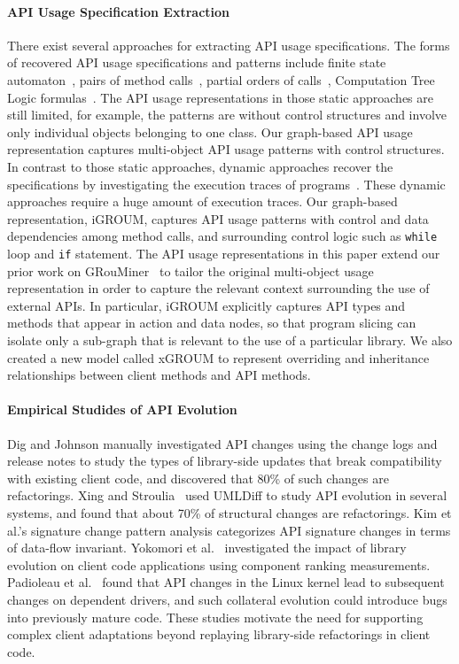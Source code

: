 \documentclass[runningheads,a4paper]{llncs}
\newcommand{\codefont}[1]{\footnotesize{\texttt{#1}}\normalsize}
\begin{document}
\paragraph{API Usage Specification Extraction} 
There exist several approaches for extracting API usage specifications. The forms of recovered API usage specifications and patterns include finite state automaton~\cite{zeller07,haozhong09}, pairs of method calls~\cite{dynamine05,williams-tse05}, partial orders of calls~\cite{mapo-fse07,taoxie-ase09}, Computation Tree Logic formulas~\cite{zeller-ase09}. The API usage representations in those static approaches are still limited, for example, the patterns are without control structures and involve only individual objects belonging to one class. Our graph-based API usage representation captures multi-object API usage patterns with control structures. In contrast to those static approaches, dynamic approaches recover the specifications by investigating the execution traces of programs~\cite{javert08,yang-icse06,shoham-issta07,ramanathan-isce07,mike-ase09}.  These dynamic approaches require a huge amount of execution traces.  Our graph-based representation, iGROUM, captures API usage patterns with control and data dependencies among method calls, and surrounding control logic such as \codefont{while} loop and \codefont{if} statement. 
The API usage representations in this paper extend our prior work on GRouMiner~\cite{fse09} to tailor the original multi-object usage representation in order to capture the relevant context surrounding the use of external APIs. In particular, iGROUM explicitly captures API types and methods that appear in action and data nodes, so that program slicing can isolate only a sub-graph that is relevant to the use of a particular library. We also created a new model called xGROUM to represent overriding and inheritance relationships between client methods and API methods. 

\paragraph{Empirical Studides of API Evolution} 
Dig and Johnson \cite{Dig2005} manually investigated API changes using the change logs and release notes to study the types of library-side updates that break compatibility with existing client code, and discovered that 80\% of such changes are refactorings. Xing and Stroulia~\cite{Xing2006:apievol} used UMLDiff to study API evolution in several systems, and found that about 70\% of structural changes are refactorings. Kim et al.'s signature change pattern analysis \cite{Kim2006:apievol} categorizes API signature changes in terms of data-flow invariant. Yokomori et al.~\cite{Yokomori2009:apiimpact} investigated the impact of library evolution on client code applications using component ranking measurements. Padioleau et al.~\cite{Padioleau2006} found that API changes in the Linux kernel lead to subsequent changes on dependent drivers, and such collateral evolution could introduce bugs into previously mature code. These studies motivate the need for supporting complex client adaptations beyond replaying library-side refactorings in client code.  
\end{document}
